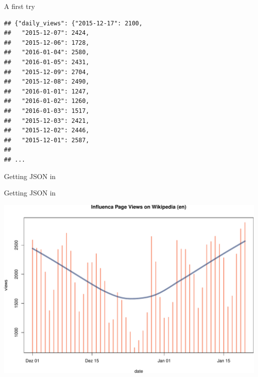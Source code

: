 \documentclass[ignorenonframetext,]{beamer}
\newenvironment{Shaded}{\begin{snugshade}}{\end{snugshade}}
\newcommand{\KeywordTok}[1]{\textcolor[rgb]{0.13,0.29,0.53}{\textbf{{#1}}}}
\newcommand{\DataTypeTok}[1]{\textcolor[rgb]{0.13,0.29,0.53}{{#1}}}
\newcommand{\DecValTok}[1]{\textcolor[rgb]{0.00,0.00,0.81}{{#1}}}
\newcommand{\StringTok}[1]{\textcolor[rgb]{0.31,0.60,0.02}{{#1}}}
\newcommand{\NormalTok}[1]{{#1}}
\begin{document}
\begin{frame}[fragile]{A first try}

\begin{verbatim}
## {"daily_views": {"2015-12-17": 2100,
##   "2015-12-07": 2424,
##   "2015-12-06": 1728,
##   "2016-01-04": 2580,
##   "2016-01-05": 2431,
##   "2015-12-09": 2704,
##   "2015-12-08": 2490,
##   "2016-01-01": 1247,
##   "2016-01-02": 1260,
##   "2016-01-03": 1517,
##   "2015-12-03": 2421,
##   "2015-12-02": 2446,
##   "2015-12-01": 2587,
##  
## ...
\end{verbatim}

\end{frame}

\begin{frame}[fragile]{Getting JSON in}

\begin{Shaded}
\end{Shaded}

\end{frame}

\begin{frame}{Getting JSON in}

\includegraphics{json_case_files/figure-beamer/unnamed-chunk-5-1.pdf}

\end{frame}
\end{document}
